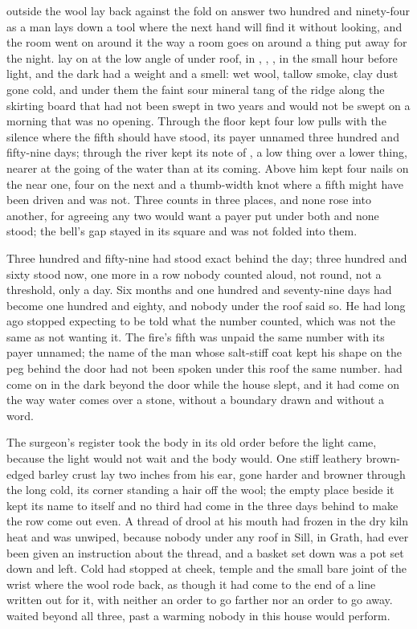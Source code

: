 
 outside the wool lay back against the fold on answer two hundred and ninety-four as a man lays down a tool where the next hand will find it without looking, and the room went on around it the way a room goes on around a thing put away for the night.  lay on  at the low angle of  under  roof, in , , , in the small hour before light, and the dark had a weight and a smell: wet wool, tallow smoke, clay dust gone cold, and under them the faint sour mineral tang of the ridge along the skirting board that had not been swept in two years and would not be swept on a morning that was no opening. Through the floor  kept four low pulls with the silence where the fifth should have stood, its payer unnamed three hundred and fifty-nine days; through  the river kept its note of , a low thing over a lower thing, nearer at the going of the water than at its coming. Above him  kept four nails on the near one, four on the next and a thumb-width knot where a fifth might have been driven and was not. Three counts in three places, and none rose into another, for agreeing any two would want a payer put under both and none stood; the bell's gap stayed in its square and was not folded into them.

Three hundred and fifty-nine had stood exact behind the day; three hundred and sixty stood now, one more in a row nobody counted aloud, not round, not a threshold, only a day. Six months and one hundred and seventy-nine days had become one hundred and eighty, and nobody under the roof said so. He had long ago stopped expecting to be told what the number counted, which was not the same as not wanting it. The fire's fifth was unpaid the same number with its payer unnamed; the name of the man whose salt-stiff coat kept his shape on the peg behind the door had not been spoken under this roof the same number.  had come on in the dark beyond the door while the house slept, and it had come on the way water comes over a stone, without a boundary drawn and without a word.

The surgeon's register took the body in its old order before the light came, because the light would not wait and the body would. One stiff leathery brown-edged barley crust lay two inches from his ear, gone harder and browner through the long cold, its corner standing a hair off the wool; the empty place beside it kept its name to itself and no third had come in the three days behind to make the row come out even. A thread of drool at his mouth had frozen in the dry kiln heat and was unwiped, because nobody under any roof in Sill, in Grath, had ever been given an instruction about the thread, and a basket set down was a pot set down and left. Cold had stopped at cheek, temple and the small bare joint of the wrist where the wool rode back, as though it had come to the end of a line written out for it, with neither an order to go farther nor an order to go away.  waited beyond all three, past a warming nobody in this house would perform.

